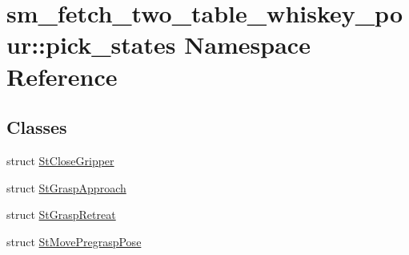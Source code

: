\hypertarget{namespacesm__fetch__two__table__whiskey__pour_1_1pick__states}{}\section{sm\+\_\+fetch\+\_\+two\+\_\+table\+\_\+whiskey\+\_\+pour\+:\+:pick\+\_\+states Namespace Reference}
\label{namespacesm__fetch__two__table__whiskey__pour_1_1pick__states}
\subsection*{Classes}
\begin{DoxyCompactItemize}
\item 
struct \hyperlink{structsm__fetch__two__table__whiskey__pour_1_1pick__states_1_1StCloseGripper}{St\+Close\+Gripper}
\item 
struct \hyperlink{structsm__fetch__two__table__whiskey__pour_1_1pick__states_1_1StGraspApproach}{St\+Grasp\+Approach}
\item 
struct \hyperlink{structsm__fetch__two__table__whiskey__pour_1_1pick__states_1_1StGraspRetreat}{St\+Grasp\+Retreat}
\item 
struct \hyperlink{structsm__fetch__two__table__whiskey__pour_1_1pick__states_1_1StMovePregraspPose}{St\+Move\+Pregrasp\+Pose}
\end{DoxyCompactItemize}
